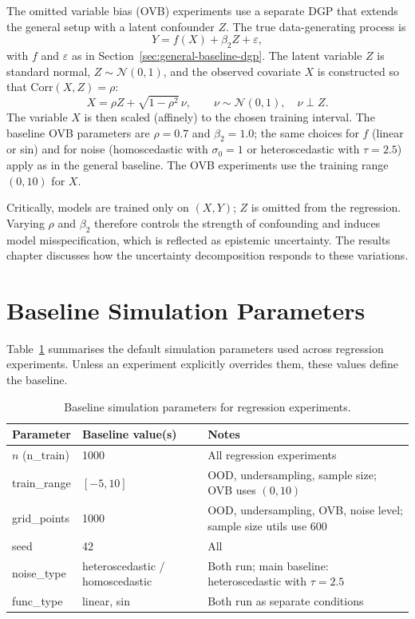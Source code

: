 The omitted variable bias (OVB) experiments use a separate DGP that extends the general setup with a latent confounder \(Z\). The true data-generating process is
\begin{equation}
  Y = f(X) + \beta_2 Z + \varepsilon,
\end{equation}
with \(f\) and \(\varepsilon\) as in Section~\ref{sec:general-baseline-dgp}. The latent variable \(Z\) is standard normal, \(Z \sim \mathcal{N}(0, 1)\), and the observed covariate \(X\) is constructed so that \(\mathrm{Corr}(X, Z) = \rho\):
\begin{equation}
  X = \rho Z + \sqrt{1 - \rho^2}\,\nu, \qquad \nu \sim \mathcal{N}(0, 1), \quad \nu \perp Z.
\end{equation}
The variable \(X\) is then scaled (affinely) to the chosen training interval. The baseline OVB parameters are \(\rho = 0.7\) and \(\beta_2 = 1.0\); the same choices for \(f\) (linear or sin) and for noise (homoscedastic with \(\sigma_0 = 1\) or heteroscedastic with \(\tau = 2.5\)) apply as in the general baseline. The OVB experiments use the training range \((0, 10)\) for \(X\).

Critically, models are trained only on \((X, Y)\); \(Z\) is omitted from the regression. Varying \(\rho\) and \(\beta_2\) therefore controls the strength of confounding and induces model misspecification, which is reflected as epistemic uncertainty. The results chapter discusses how the uncertainty decomposition responds to these variations.

\section{Baseline Simulation Parameters}
\label{sec:baseline-sim-params}

Table~\ref{tab:baseline-sim-params} summarises the default simulation parameters used across regression experiments. Unless an experiment explicitly overrides them, these values define the baseline.

\begin{table}[htbp]
  \centering
  \caption{Baseline simulation parameters for regression experiments.}
  \label{tab:baseline-sim-params}
  \begin{tabular}{lll}
    \toprule
    Parameter & Baseline value(s) & Notes \\
    \midrule
    \(n\) (n\_train) & 1000 & All regression experiments \\
    train\_range & \([-5, 10]\) & OOD, undersampling, sample size; OVB uses \((0, 10)\) \\
    grid\_points & 1000 & OOD, undersampling, OVB, noise level; sample size utils use 600 \\
    seed & 42 & All \\
    noise\_type & heteroscedastic / homoscedastic & Both run; main baseline: heteroscedastic with \(\tau = 2.5\) \\
    func\_type & linear, sin & Both run as separate conditions \\
    \bottomrule
  \end{tabular}
\end{table}

